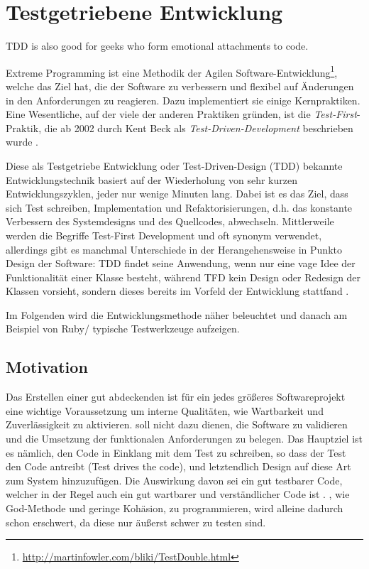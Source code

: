 \chapter{Testgetriebene Entwicklung}
\label{sec:tdd}

\epigraph{TDD is also good for geeks who form emotional attachments to code. }{\cite{beck_test_2002}}Extreme Programming ist eine Methodik der Agilen Software-Entwicklung\footnote{\url{http://martinfowler.com/bliki/TestDouble.html}}, welche das Ziel hat, die  der Software zu verbessern und flexibel auf Änderungen in den Anforderungen zu reagieren. Dazu implementiert sie einige Kernpraktiken. Eine Wesentliche, auf der viele der anderen Praktiken gründen, ist die \textit{Test-First}-Praktik, die ab 2002 durch Kent Beck als \textit{Test-Driven-Development} beschrieben wurde \citep{beck_test_2002}.

Diese als Testgetriebe Entwicklung oder Test-Driven-Design (TDD) bekannte Entwicklungstechnik basiert auf der Wiederholung von sehr kurzen Entwicklungszyklen, jeder nur wenige Minuten lang. Dabei ist es das Ziel, dass sich Test schreiben, Implementation und Refaktorisierungen, d.h. das konstante Verbessern des Systemdesigns und des Quellcodes, abwechseln. Mittlerweile werden die Begriffe Test-First Development und  oft synonym verwendet, allerdings gibt es manchmal Unterschiede in der Herangehensweise in Punkto Design der Software: TDD findet seine Anwendung, wenn nur eine vage Idee der Funktionalität einer Klasse besteht, während TFD kein Design oder Redesign der Klassen vorsieht, sondern dieses bereits im Vorfeld der Entwicklung stattfand \citep{stackoverflow_testing_2008}.


Im Folgenden wird die Entwicklungsmethode  näher beleuchtet und danach am Beispiel von Ruby/ typische Testwerkzeuge aufzeigen.




\section{Motivation}
 Das Erstellen einer gut abdeckenden  ist für ein jedes größeres Softwareprojekt eine wichtige Voraussetzung um interne Qualitäten, wie Wartbarkeit und Zuverlässigkeit zu aktivieren.  soll nicht dazu dienen, die Software zu validieren und die Umsetzung der funktionalen Anforderungen zu belegen. Das Hauptziel ist es nämlich, den Code in Einklang mit dem Test zu schreiben, so dass der Test den Code antreibt (Test drives the code), und letztendlich Design auf diese Art zum System hinzuzufügen. Die Auswirkung davon sei ein gut testbarer Code, welcher in der Regel auch ein gut wartbarer und verständlicher Code ist \citep{beck_test_2002}. , wie God-Methode und geringe Kohäsion, zu programmieren, wird alleine dadurch schon erschwert, da diese nur äußerst schwer zu testen sind.


